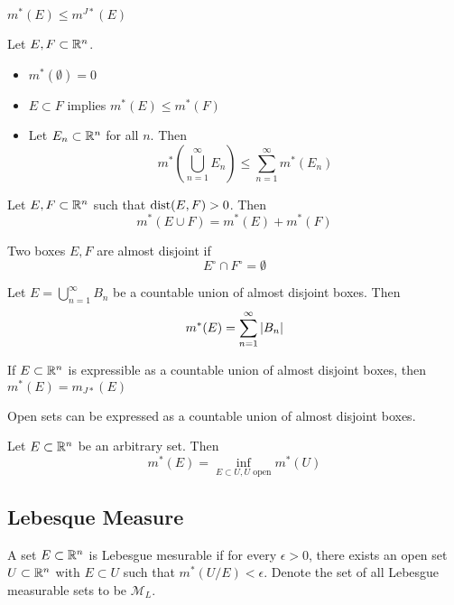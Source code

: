 \documentclass[a4paper]{article}
\begin{document}
\begin{prp} $m^\ast(E)\leq m^{J\ast}(E)$
\end{prp}

\begin{prp} Let $E,F\subset\mathbb{R}^n$. 
\begin{itemize}
\item $m^\ast(\emptyset)=0$
\item $E\subset F$ implies $m^\ast(E)\leq m^\ast(F)$
\item Let $E_n\subset\mathbb{R}^n$ for all $n$. Then $$m^\ast\left(\bigcup_{n=1}^\infty E_n\right)\leq\sum_{n=1}^\infty m^\ast(E_n)$$
\end{itemize}
\end{prp}

\begin{lmm} Let $E,F\subset\mathbb{R}^n$ such that $\operatorname{dist}(E,F)>0$. Then $$m^\ast(E\cup F)=m^\ast(E)+m^\ast(F)$$
\end{lmm}

\begin{defn} Two boxes $E,F$ are almost disjoint if $$E^\circ\cap F^\circ=\emptyset$$
\end{defn}

\begin{lmm} Let $E=\bigcup_{n=1}^\infty B_n$ be a countable union of almost disjoint boxes. Then $$m^\ast(E)=\sum_{n=1}^\infty\abs{B_n}$$
\end{lmm}

\begin{lmm} If $E\subset\mathbb{R}^n$ is expressible as a countable union of almost disjoint boxes, then $m^\ast(E)=m_{J\ast}(E)$
\end{lmm}

\begin{lmm} Open sets can be expressed as a countable union of almost disjoint boxes. 
\end{lmm}

\begin{lmm} Let $E\subset\mathbb{R}^n$ be an arbitrary set. Then $$m^\ast(E)=\inf_{E\subset U,U\text{ open}}m^\ast(U)$$
\end{lmm}

\subsection{Lebesque Measure}
\begin{defn} A set $E\subset\mathbb{R}^n$ is Lebesgue mesurable if for every $\epsilon>0$, there exists an open set $U\subset\mathbb{R}^n$ with $E\subset U$ such that $m^\ast(U/E)<\epsilon$. Denote the set of all Lebesgue measurable sets to be $\mathcal{M}_L$. 
\end{defn}
\end{document}
